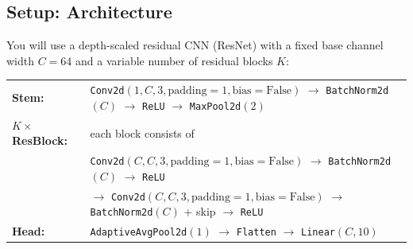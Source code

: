 \documentclass[submit]{../harvardml}
\begin{document}
\begin{problem}
\subsection*{Setup: Architecture}
You will use a depth-scaled residual CNN (ResNet) with a fixed base channel width $C = 64$ and a variable number of residual blocks $K$:
\begin{center}
\begin{tabular}{@{}l@{\;}l@{}}
\textbf{Stem:} & \texttt{Conv2d}$(1, C, 3, \text{padding}=1, \text{bias}=\text{False})$ $\to$ \texttt{BatchNorm2d}$(C)$ $\to$ \texttt{ReLU} $\to$ \texttt{MaxPool2d}$(2)$ \\[6pt]
\textbf{$K \times$ ResBlock:} & each block consists of \\[2pt]
& \quad \texttt{Conv2d}$(C, C, 3, \text{padding}=1, \text{bias}=\text{False})$ $\to$ \texttt{BatchNorm2d}$(C)$ $\to$ \texttt{ReLU} \\[2pt]
& \quad $\to$ \texttt{Conv2d}$(C, C, 3, \text{padding}=1, \text{bias}=\text{False})$ $\to$ \texttt{BatchNorm2d}$(C)$ + skip $\to$ \texttt{ReLU} \\[6pt]
\textbf{Head:} & \texttt{AdaptiveAvgPool2d}$(1)$ $\to$ \texttt{Flatten} $\to$ \texttt{Linear}$(C, 10)$
\end{tabular}
\end{center}


\end{problem}
\end{document}
